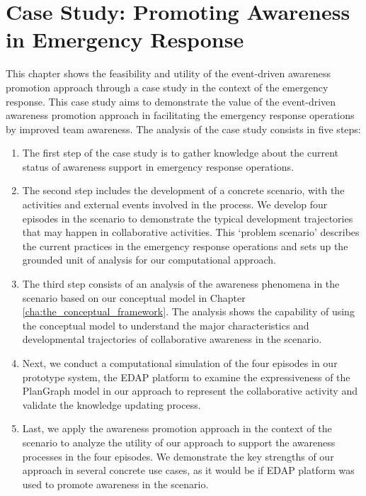 \graphicspath{{Figures/}}

\chapter{Case Study: Promoting Awareness in Emergency Response} %
\label{cha:case_studies}

This chapter shows the feasibility and utility of the event-driven awareness promotion approach through a case study in the context of the emergency response. This case study aims to demonstrate the value of the event-driven awareness promotion approach in facilitating the emergency response operations by improved team awareness. The analysis of the case study consists in five steps:

\begin{enumerate}
	\item The first step of the case study is to gather knowledge about the current status of awareness support in emergency response operations.
	\item The second step includes the development of a concrete scenario, with the activities and external events involved in the process. We develop four episodes in the scenario to demonstrate the typical development trajectories that may happen in collaborative activities. This `problem scenario' \cite{rosson2001usability} describes the current practices in the emergency response operations and sets up the grounded unit of analysis for our computational approach.
	\item The third step consists of an analysis of the awareness phenomena in the scenario based on our conceptual model in Chapter \ref{cha:the_conceptual_framework}. The analysis shows the capability of using the conceptual model to understand the major characteristics and developmental trajectories of collaborative awareness in the scenario.
	\item Next, we conduct a computational simulation of the four episodes in our prototype system, the EDAP platform to examine the expressiveness of the PlanGraph model in our approach to represent the collaborative activity and validate the knowledge updating process.
	\item Last, we apply the awareness promotion approach in the context of the scenario to analyze the utility of our approach to support the awareness processes in the four episodes. We demonstrate the key strengths of our approach in several concrete use cases, as it would be if EDAP platform was used to promote awareness in the scenario.
\end{enumerate}

